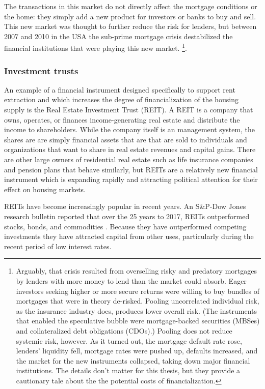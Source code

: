 The transactions in this market do not directly affect the mortgage conditions or the home: they simply add a new product for investors or banks to buy and sell. This new market was thought to further reduce the risk for lenders, but  between 2007 and 2010 in the USA the sub-prime mortgage crisis destabilized the financial institutions that were playing this new market. \footnote{Arguably, that crisis resulted from overselling risky and predatory mortgages by lenders with more money to lend than the market could absorb. Eager investors seeking higher or more secure returns were willing  to buy bundles of  mortgages that were in theory de-risked. Pooling uncorrelated individual risk, as the insurance industry does, produces lower overall risk. (The instruments that enabled the speculative bubble were mortgage-backed securities (MBSes) and collateralized debt obligations (CDOs).) Pooling does not reduce systemic risk, however. As it turned out, the mortgage default rate rose, lenders' liquidity fell, mortgage rates were pushed up, defaults increased, and the market for the new instruments collapsed, taking down major financial institutions. The details don't matter for this thesis, but they provide a cautionary tale about the the potential costs of financialization.}.  

\subsubsection{Investment trusts}
An example of a financial instrument designed specifically to support rent extraction and which increases the degree of financialization of the housing supply is the  Real Estate Investment Trust (REIT).  A REIT is a company that owns, operates, or finances income-generating real estate and distribute the income to shareholders. While the company itself is an management system, the shares are are simply financial assets that are that are sold to individuals and organizations that want to share in real estate revenues and capital gains. There are other large owners of residential real estate such as life insurance companies and pension plans that behave similarly, but REITs are a relatively new financial instrument which is  expanding rapidly and attracting political attention for their effect on housing markets.  %

REITs have become increasingly popular in recent years.  An S\&P-Dow Jones research bulletin reported that over the  25 years to 2017, REITs outperformed stocks, bonds, and commodities \cite{GET-Dow-Jones-research-bulletin}. %
Because they have outperformed competing investments they have attracted  capital from other uses, particularly during the recent period of low interest rates.

